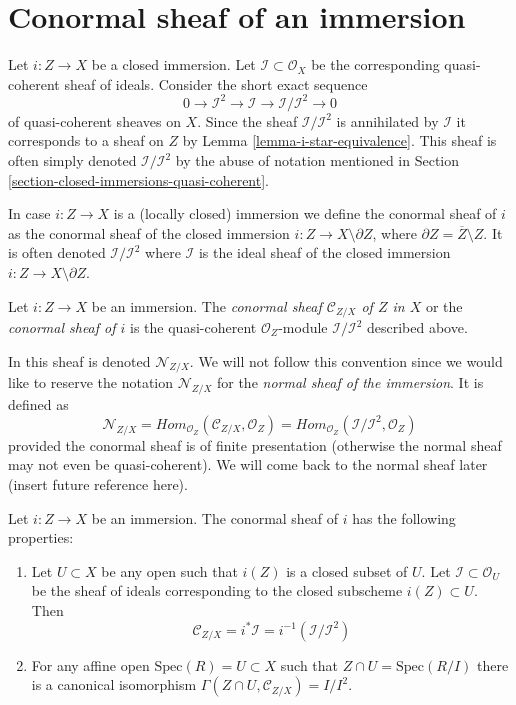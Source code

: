 \section{Conormal sheaf of an immersion}
\label{section-conormal-sheaf}

\noindent
Let $i : Z \to X$ be a closed immersion. Let
$\mathcal{I} \subset \mathcal{O}_X$ be the corresponding quasi-coherent
sheaf of ideals. Consider the short exact sequence
$$
0 \to \mathcal{I}^2 \to \mathcal{I} \to \mathcal{I}/\mathcal{I}^2 \to 0
$$
of quasi-coherent sheaves on $X$. Since the sheaf $\mathcal{I}/\mathcal{I}^2$
is annihilated by $\mathcal{I}$ it corresponds to a sheaf on $Z$ by
Lemma \ref{lemma-i-star-equivalence}. This sheaf is often simply denoted
$\mathcal{I}/\mathcal{I}^2$ by the abuse of notation mentioned in
Section \ref{section-closed-immersions-quasi-coherent}.

\medskip\noindent
In case $i : Z \to X$ is a (locally closed) immersion we define the
conormal sheaf of $i$ as the conormal sheaf of the closed
immersion $i : Z \to X \setminus \partial Z$, where
$\partial Z = \overline{Z} \setminus Z$. It is often denoted
$\mathcal{I}/\mathcal{I}^2$ where $\mathcal{I}$ is the ideal sheaf
of the closed immersion $i : Z \to X \setminus \partial Z$.

\begin{definition}
\label{definition-conormal-sheaf}
Let $i : Z \to X$ be an immersion. The {\it conormal sheaf
$\mathcal{C}_{Z/X}$ of $Z$ in $X$} or the {\it conormal sheaf of $i$}
is the quasi-coherent $\mathcal{O}_Z$-module $\mathcal{I}/\mathcal{I}^2$
described above.
\end{definition}

\noindent
In \cite[IV Definition 16.1.2]{EGA} this sheaf is denoted
$\mathcal{N}_{Z/X}$. We will not follow this convention since we would
like to reserve the notation $\mathcal{N}_{Z/X}$
for the {\it normal sheaf of the immersion}. It is defined as
$$
\mathcal{N}_{Z/X} =
\textit{Hom}_{\mathcal{O}_Z}(\mathcal{C}_{Z/X}, \mathcal{O}_Z) =
\textit{Hom}_{\mathcal{O}_Z}(\mathcal{I}/\mathcal{I}^2, \mathcal{O}_Z)
$$
provided the conormal sheaf is of finite presentation (otherwise the
normal sheaf may not even be quasi-coherent). We will come back to the
normal sheaf later (insert future reference here).

\begin{lemma}
\label{lemma-affine-conormal}
Let $i : Z \to X$ be an immersion. The conormal sheaf
of $i$ has the following properties:
\begin{enumerate}
\item Let $U \subset X$ be any open such that $i(Z)$ is
a closed subset of $U$. Let $\mathcal{I} \subset \mathcal{O}_U$
be the sheaf of ideals corresponding to the closed subscheme
$i(Z) \subset U$. Then
$$
\mathcal{C}_{Z/X} = i^*\mathcal{I} = i^{-1}(\mathcal{I}/\mathcal{I}^2)
$$
\item
For any affine open $\text{Spec}(R) = U \subset X$
such that $Z \cap U = \text{Spec}(R/I)$ there is a
canonical isomorphism
$\Gamma(Z \cap U, \mathcal{C}_{Z/X}) = I/I^2$.
\end{enumerate}
\end{lemma}

